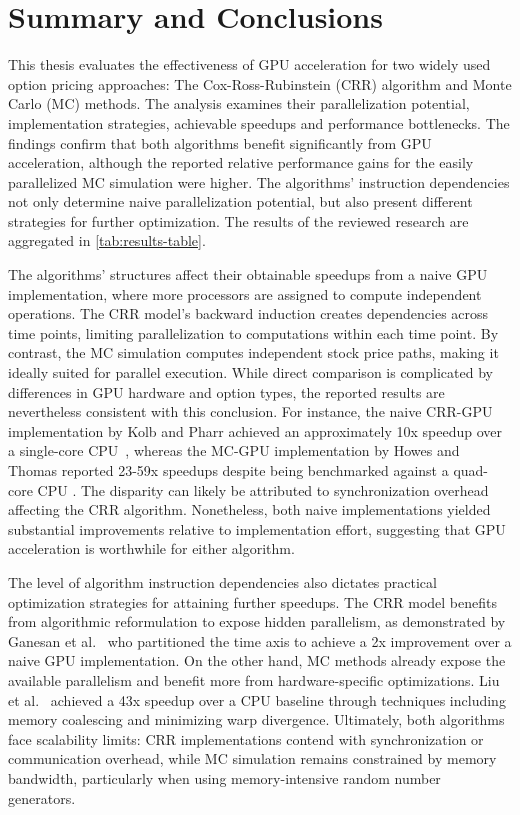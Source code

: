 \documentclass[english,12pt,a4paper,pdftex,sci,utf8]{aaltothesis}
\begin{document}
\section{Summary and Conclusions}  \label{sec:summary-conclusions}
This thesis evaluates the effectiveness of GPU acceleration for two widely used option pricing approaches: The Cox-Ross-Rubinstein (CRR) algorithm and Monte Carlo (MC) methods. The analysis examines their parallelization potential, implementation strategies, achievable speedups and performance bottlenecks. The findings confirm that both algorithms benefit significantly from GPU acceleration, although the reported relative performance gains for the easily parallelized MC simulation were higher. The algorithms' instruction dependencies not only determine naive parallelization potential, but also present different strategies for further optimization. The results of the reviewed research are aggregated in \cref{tab:results-table}.

The algorithms' structures affect their obtainable speedups from a naive GPU implementation, where more processors are assigned to compute independent operations. The CRR model's backward induction creates dependencies across time points, limiting parallelization to computations within each time point. By contrast, the MC simulation computes independent stock price paths, making it ideally suited for parallel execution. While direct comparison is complicated by differences in GPU hardware and option types, the reported results are nevertheless consistent with this conclusion. For instance, the naive CRR-GPU implementation by Kolb and Pharr achieved an approximately 10x speedup over a single-core CPU~\cite{pharr2005gpu}, whereas the MC-GPU implementation by Howes and Thomas reported 23-59x speedups despite being benchmarked against a quad-core CPU \cite{nguyen2007gpu}. The disparity can likely be attributed to synchronization overhead affecting the CRR algorithm. Nonetheless, both naive implementations yielded substantial improvements relative to implementation effort, suggesting that GPU acceleration is worthwhile for either algorithm. 

The level of algorithm instruction dependencies also dictates practical optimization strategies for attaining further speedups. The CRR model benefits from algorithmic reformulation to expose hidden parallelism, as demonstrated by Ganesan et al.\ \cite{ganesan2009acceleration} who partitioned the time axis to achieve a 2x improvement over a naive GPU implementation. On the other hand, MC methods already expose the available parallelism and benefit more from hardware-specific optimizations. Liu et al.\ \cite{liu2010efficient} achieved a 43x speedup over a CPU baseline through techniques including memory coalescing and minimizing warp divergence. Ultimately, both algorithms face scalability limits: CRR implementations contend with synchronization or communication overhead, while MC simulation remains constrained by memory bandwidth, particularly when using memory-intensive random number generators.
\end{document}
